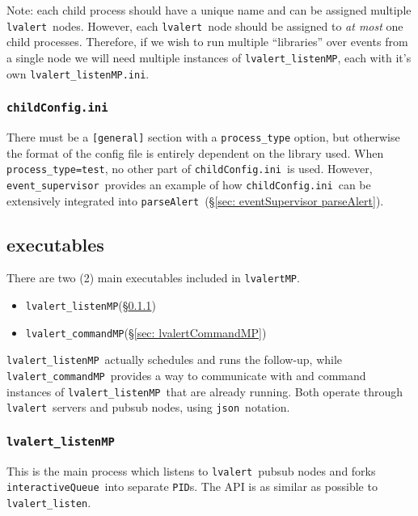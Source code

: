 \documentclass{article}
\newcommand{\PID}{\texttt{PID}}
\newcommand{\alert}{\texttt{lvalert}}
\newcommand{\lvalertListen}{\texttt{lvalert\_listen}}
\newcommand{\lvalertMP}{\texttt{lvalertMP}}
\newcommand{\lvalertListenMP}{\texttt{lvalert\_listenMP}}
\newcommand{\lvalertCommandMP}{\texttt{lvalert\_commandMP}}
\newcommand{\interactiveQueue}{\texttt{interactiveQueue}}
\newcommand{\parseAlert}{\texttt{parseAlert}}
\newcommand{\lvalertMPini}{\texttt{lvalert\_listenMP.ini}}
\newcommand{\childConfigini}{\texttt{childConfig.ini}}
\newcommand{\eventSupervisor}{\texttt{event\_supervisor}}
\newcommand{\json}{\texttt{json}}
\begin{document}
Note: each child process should have a unique name and can be assigned multiple \alert~nodes. 
However, each \alert~node should be assigned to \textit{at most} one child processes. 
Therefore, if we wish to run multiple ``libraries'' over events from a single node we will need multiple instances of \lvalertListenMP, each with it's own \lvalertMPini.


\subsubsection{\childConfigini}
\label{sec: childConfigini}

There must be a \texttt{[general]} section with a \texttt{process\_type} option, but otherwise the format of the config file is entirely dependent on the library used.
When \texttt{process\_type=test}, no other part of \childConfigini~is used.
However, \eventSupervisor~provides an example of how \childConfigini~can be extensively integrated into \parseAlert~(\S\ref{sec: eventSupervisor parseAlert}).


\subsection{executables}
\label{sec: executables}

There are two (2) main executables included in \lvalertMP.
\begin{itemize}
    \item{\lvalertListenMP (\S\ref{sec: lvalertListenMP})}
    \item{\lvalertCommandMP (\S\ref{sec: lvalertCommandMP})}
\end{itemize}
\lvalertListenMP~actually schedules and runs the follow-up, while \lvalertCommandMP~provides a way to communicate with and command instances of \lvalertListenMP~that are already running.
Both operate through \alert~servers and pubsub nodes, using \json~notation.


\subsubsection{\lvalertListenMP}
\label{sec: lvalertListenMP}

This is the main process which listens to \alert~pubsub nodes and forks \interactiveQueue~into separate {\PID}s. 
The API is as similar as possible to \lvalertListen.
\end{document}
